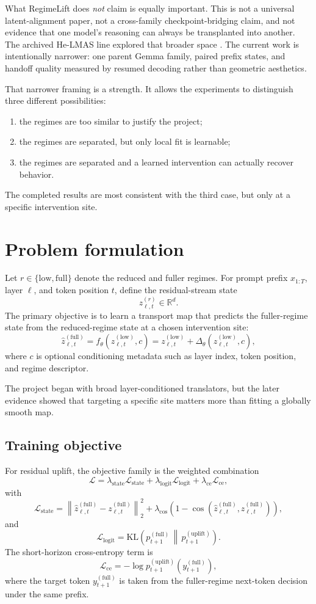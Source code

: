 \documentclass[11pt]{article}
\newcommand{\R}{\mathbb{R}}
\newcommand{\low}{\mathrm{low}}
\newcommand{\full}{\mathrm{full}}
\newcommand{\KL}{\mathrm{KL}}
\begin{document}
What RegimeLift does \emph{not} claim is equally important. This is not a universal latent-alignment paper, not a cross-family checkpoint-bridging claim, and not evidence that one model's reasoning can always be transplanted into another. The archived He-LMAS line explored that broader space \cite{helmasLegacy2026}. The current work is intentionally narrower: one parent Gemma family, paired prefix states, and handoff quality measured by resumed decoding rather than geometric aesthetics.

That narrower framing is a strength. It allows the experiments to distinguish three different possibilities:
\begin{enumerate}[leftmargin=1.4em]
    \item the regimes are too similar to justify the project;
    \item the regimes are separated, but only local fit is learnable;
    \item the regimes are separated and a learned intervention can actually recover behavior.
\end{enumerate}
The completed results are most consistent with the third case, but only at a specific intervention site.

\section{Problem formulation}
Let $r \in \{\low,\full\}$ denote the reduced and fuller regimes. For prompt prefix $x_{1:T}$, layer $\ell$, and token position $t$, define the residual-stream state
\[
z^{(r)}_{\ell,t} \in \R^d.
\]
The primary objective is to learn a transport map that predicts the fuller-regime state from the reduced-regime state at a chosen intervention site:
\[
\hat{z}^{(\full)}_{\ell,t} = f_\theta\!\left(z^{(\low)}_{\ell,t}, c\right)
= z^{(\low)}_{\ell,t} + \Delta_\theta\!\left(z^{(\low)}_{\ell,t}, c\right),
\]
where $c$ is optional conditioning metadata such as layer index, token position, and regime descriptor.

The project began with broad layer-conditioned translators, but the later evidence showed that targeting a specific site matters more than fitting a globally smooth map.

\subsection{Training objective}
For residual uplift, the objective family is the weighted combination
\[
\mathcal{L}
= \lambda_{\text{state}} \mathcal{L}_{\text{state}}
+ \lambda_{\text{logit}} \mathcal{L}_{\text{logit}}
+ \lambda_{\text{ce}} \mathcal{L}_{\text{ce}},
\]
with
\[
\mathcal{L}_{\text{state}}
= \left\lVert \hat{z}^{(\full)}_{\ell,t} - z^{(\full)}_{\ell,t} \right\rVert_2^2
+ \lambda_{\cos}\left(1 - \cos\!\left(\hat{z}^{(\full)}_{\ell,t}, z^{(\full)}_{\ell,t}\right)\right),
\]
and
\[
\mathcal{L}_{\text{logit}}
= \KL\!\left(
p^{(\full)}_{t+1} \,\middle\|\, p^{(\text{uplift})}_{t+1}
\right).
\]
The short-horizon cross-entropy term is
\[
\mathcal{L}_{\text{ce}}
= -\log p^{(\text{uplift})}_{t+1}\!\left(y^{(\full)}_{t+1}\right),
\]
where the target token $y^{(\full)}_{t+1}$ is taken from the fuller-regime next-token decision under the same prefix.
\end{document}
